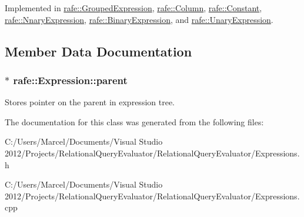 Implemented in \hyperlink{classrafe_1_1_grouped_expression_ab770657757c0b374e4eacc8112ba9c4f}{rafe\+::\+Grouped\+Expression}, \hyperlink{classrafe_1_1_column_a420f51cd25221b94cbc0dcb7391ee950}{rafe\+::\+Column}, \hyperlink{classrafe_1_1_constant_a5c74a0f6230626f3e49ecaae189c7a7f}{rafe\+::\+Constant}, \hyperlink{classrafe_1_1_nnary_expression_a3e7adc7e9dc45caa0a6ac3919564a921}{rafe\+::\+Nnary\+Expression}, \hyperlink{classrafe_1_1_binary_expression_ac094c4a5686ded1827d12e14bdfae1c6}{rafe\+::\+Binary\+Expression}, and \hyperlink{classrafe_1_1_unary_expression_adef2ed922c3a5d6248469dc6e0b78842}{rafe\+::\+Unary\+Expression}.



\subsection{Member Data Documentation}
\hypertarget{classrafe_1_1_expression_ae6f0ee539cc324899c34926733fe33b1}{
\subsubsection[{parent}]{$\ast$ rafe\+::\+Expression\+::parent}}\label{classrafe_1_1_expression_ae6f0ee539cc324899c34926733fe33b1}
Stores pointer on the parent in expression tree. 

The documentation for this class was generated from the following files\+:\begin{DoxyCompactItemize}
\item 
C\+:/\+Users/\+Marcel/\+Documents/\+Visual Studio 2012/\+Projects/\+Relational\+Query\+Evaluator/\+Relational\+Query\+Evaluator/Expressions.\+h\item 
C\+:/\+Users/\+Marcel/\+Documents/\+Visual Studio 2012/\+Projects/\+Relational\+Query\+Evaluator/\+Relational\+Query\+Evaluator/Expressions.\+cpp\end{DoxyCompactItemize}
